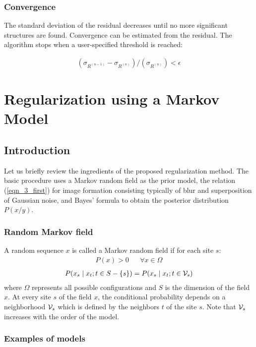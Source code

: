 \subsubsection{Convergence}
 
The standard deviation of the residual decreases until no more
significant structures are found. Convergence can be estimated
from the residual. The algorithm stops when a user-specified threshold is
reached:
 
\begin{eqnarray}
(\sigma_{{R}^{(n-1)}} - \sigma_{{R}^{(n)}})/(\sigma_{{R}^{(n)}})   < \epsilon
\end{eqnarray}


\section{Regularization using a Markov Model}
\subsection{Introduction}

Let us briefly review the ingredients of the proposed regularization method.
The basic procedure uses a Markov random field as the prior model, 
the relation (\ref{eqn_3_first}) for image formation consisting typically of blur and superposition
of Gaussian noise, and Bayes' formula to obtain the posterior distribution 
$P(x/y)$. 

\subsubsection*{Random Markov field}

A random sequence $x$ is called a Markov random field if for each site $s$:
\begin{eqnarray}
P({x}) > 0 && \forall {x}\in \Omega  
\end{eqnarray}
\begin{eqnarray}
P(x_s \mid x_t;t\in S-\{s\}) = P(x_s \mid x_t;t\in{{\cal V}_s}) 
\end{eqnarray}
where $\Omega$ represents all possible configurations and $S$ is the dimension of
the field $x$.
At every site $s$ of the field $x$, the conditional probability  
depends on a neighborhood ${\cal V}_s$ which is defined by the neighbors $t$ of the 
site $s$. Note that ${\cal V}_s$ increases with the order of the model.

\subsubsection*{Examples of models}

